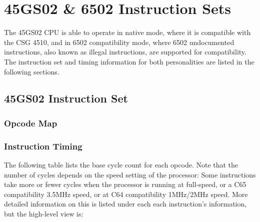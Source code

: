 \chapter{45GS02 \& 6502 Instruction Sets}

The 45GS02 CPU is able to operate in native mode, where it
is compatible with the CSG 4510, and in 6502 compatibility mode,
where 6502 undocumented instructions, also known as illegal
instructions, are supported for compatibility.  The instruction set and
timing information for both personalities are listed in the following
sections.

\section{45GS02 Instruction Set}

\subsection{Opcode Map}

\begin{center}
\end{center}

\subsection{Instruction Timing}

The following table lists the base cycle count for each opcode.
Note that the number of cycles depends on the speed setting of the
processor: Some instructions take more or fewer cycles when the
processor is running at full-speed, or a C65 compatibility 3.5MHz speed,
or at C64 compatibility 1MHz/2MHz speed.  More detailed information on
this is listed under each each instruction's information, but the high-level
view is:

